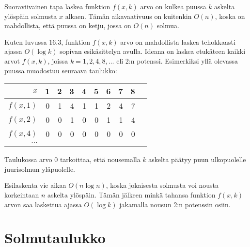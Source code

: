 Suoraviivainen tapa laskea funktion $f(x,k)$
arvo on kulkea puussa $k$ askelta ylöspäin
solmusta $x$ alkaen.
Tämän aikavaativuus on kuitenkin $O(n)$,
koska on mahdollista, että puussa on
ketju, jossa on $O(n)$ solmua.

Kuten luvussa 16.3, funktion $f(x,k)$
arvo on mahdollista laskea tehokkaasti ajassa
$O(\log k)$ sopivan esikäsittelyn avulla.
Ideana on laskea etukäteen kaikki arvot
$f(x,k)$, joissa $k=1,2,4,8,\ldots$ eli 2:n potenssi.
Esimerkiksi yllä olevassa puussa muodostuu seuraava taulukko:

\begin{center}
\begin{tabular}{r|rrrrrrrrr}
$x$ & 1 & 2 & 3 & 4 & 5 & 6 & 7 & 8 \\
\hline
$f(x,1)$ & 0 & 1 & 4 & 1 & 1 & 2 & 4 & 7 \\
$f(x,2)$ & 0 & 0 & 1 & 0 & 0 & 1 & 1 & 4 \\
$f(x,4)$ & 0 & 0 & 0 & 0 & 0 & 0 & 0 & 0 \\
$\cdots$ \\
\end{tabular}
\end{center}

Taulukossa arvo 0 tarkoittaa, että nousemalla $k$
askelta päätyy puun ulkopuolelle juurisolmun yläpuolelle.

Esilaskenta vie aikaa $O(n \log n)$, koska jokaisesta
solmusta voi nousta korkeintaan $n$ askelta ylöspäin.
Tämän jälkeen minkä tahansa funktion $f(x,k)$ arvon saa
laskettua ajassa $O(\log k)$ jakamalla nousun 2:n
potenssin osiin.

\section{Solmutaulukko}


